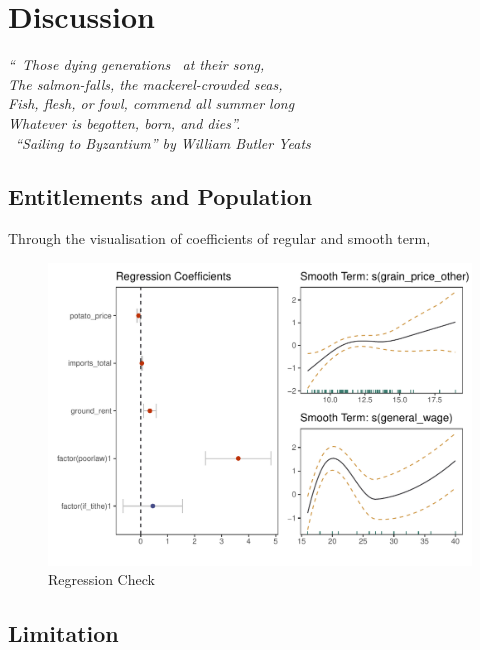 \chapter{Discussion}

\textit{``\textendash\ Those dying generations \textendash\ at their song,\\
The salmon-falls, the mackerel-crowded seas,\\
Fish, flesh, or fowl, commend all summer long\\
Whatever is begotten, born, and dies''.\\
\textemdash\ ``Sailing to Byzantium'' by William Butler Yeats }

\vspace{.2cm}

\section{Entitlements and Population}
Through the visualisation of coefficients of regular and smooth term, 
\begin{figure}[h]
    \centering
    \caption{Regression Check}
    \includegraphics[width=.9\textwidth]{../03_outputs/coef.visual.pdf}
\end{figure}
\vspace{-7pt}

\section{Limitation}




